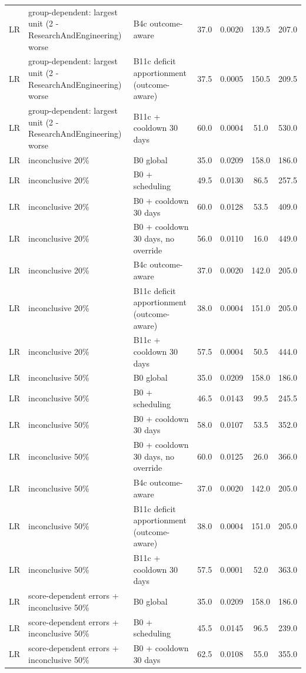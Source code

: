 \begin{longtable}{lp{5.2cm}p{4.4cm}cccc}
LR & group-dependent: largest unit (2 - ResearchAndEngineering) worse & B4c outcome-aware & 37.0 & 0.0020 & 139.5 & 207.0 \\
LR & group-dependent: largest unit (2 - ResearchAndEngineering) worse & B11c deficit apportionment (outcome-aware) & 37.5 & 0.0005 & 150.5 & 209.5 \\
LR & group-dependent: largest unit (2 - ResearchAndEngineering) worse & B11c + cooldown 30 days & 60.0 & 0.0004 & 51.0 & 530.0 \\
LR & inconclusive 20\% & B0 global & 35.0 & 0.0209 & 158.0 & 186.0 \\
LR & inconclusive 20\% & B0 + scheduling & 49.5 & 0.0130 & 86.5 & 257.5 \\
LR & inconclusive 20\% & B0 + cooldown 30 days & 60.0 & 0.0128 & 53.5 & 409.0 \\
LR & inconclusive 20\% & B0 + cooldown 30 days, no override & 56.0 & 0.0110 & 16.0 & 449.0 \\
LR & inconclusive 20\% & B4c outcome-aware & 37.0 & 0.0020 & 142.0 & 205.0 \\
LR & inconclusive 20\% & B11c deficit apportionment (outcome-aware) & 38.0 & 0.0004 & 151.0 & 205.0 \\
LR & inconclusive 20\% & B11c + cooldown 30 days & 57.5 & 0.0004 & 50.5 & 444.0 \\
LR & inconclusive 50\% & B0 global & 35.0 & 0.0209 & 158.0 & 186.0 \\
LR & inconclusive 50\% & B0 + scheduling & 46.5 & 0.0143 & 99.5 & 245.5 \\
LR & inconclusive 50\% & B0 + cooldown 30 days & 58.0 & 0.0107 & 53.5 & 352.0 \\
LR & inconclusive 50\% & B0 + cooldown 30 days, no override & 60.0 & 0.0125 & 26.0 & 366.0 \\
LR & inconclusive 50\% & B4c outcome-aware & 37.0 & 0.0020 & 142.0 & 205.0 \\
LR & inconclusive 50\% & B11c deficit apportionment (outcome-aware) & 38.0 & 0.0004 & 151.0 & 205.0 \\
LR & inconclusive 50\% & B11c + cooldown 30 days & 57.5 & 0.0001 & 52.0 & 363.0 \\
LR & score-dependent errors + inconclusive 50\% & B0 global & 35.0 & 0.0209 & 158.0 & 186.0 \\
LR & score-dependent errors + inconclusive 50\% & B0 + scheduling & 45.5 & 0.0145 & 96.5 & 239.0 \\
LR & score-dependent errors + inconclusive 50\% & B0 + cooldown 30 days & 62.5 & 0.0108 & 55.0 & 355.0 \\

\end{longtable}
